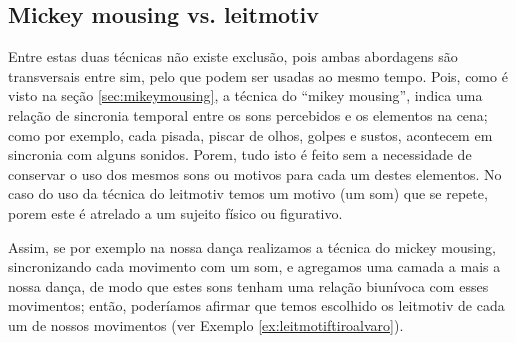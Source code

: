 \subsection{Mickey mousing vs. leitmotiv}
Entre estas duas técnicas não existe exclusão, pois ambas abordagens são transversais entre sim,
pelo que podem ser usadas ao mesmo tempo.
Pois, como é visto na seção \ref{sec:mikeymousing}, a técnica do ``mikey mousing'',
indica uma relação de sincronia temporal entre os sons percebidos e os elementos na cena;
como por exemplo, cada pisada, piscar de olhos, golpes e sustos,  acontecem em sincronia com alguns sonidos.
Porem, tudo isto é feito sem a necessidade de conservar o uso dos mesmos sons ou motivos para cada um destes elementos.
No caso do uso da técnica do leitmotiv temos um motivo (um som)
que se repete, porem este é atrelado a um sujeito físico ou figurativo.

Assim, se por exemplo na nossa dança realizamos a técnica do mickey mousing, 
sincronizando cada movimento com um som, 
e agregamos uma camada a mais a nossa dança, de modo que estes sons tenham uma relação biunívoca com esses movimentos; 
então, poderíamos afirmar que temos escolhido os leitmotiv de cada um de nossos movimentos (ver Exemplo \ref{ex:leitmotiftiroalvaro}). 

